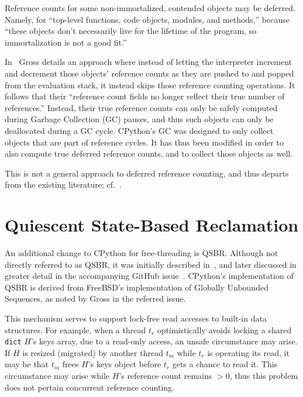 Reference counts for some non-immortalized, contended objects may be deferred.
Namely, for ``top-level functions, code objects, modules, and methods,'' because ``these objects don't necessarily live for the lifetime of the program, so immortalization is not a good fit.''

In~\cite[\S Deferred Reference Counting]{pep703} Gross details an approach where instead of letting the interpreter increment and decrement those objects' reference counts as they are pushed to and popped from the evaluation stack, it instead skips those reference counting operations.
It follows that their ``reference count fields no longer reflect their true number of references.''
Instead, their true reference counts can only be safely computed during Garbage Collection (GC) pauses, and thus such objects can only be deallocated during a GC cycle.
CPython's GC was designed to only collect objects that are part of reference cycles.
It has thus been modified in order to also compute true deferred reference counts, and to collect those objects as well.

This is not a general approach to deferred reference counting, and thus departs from the existing literature; cf.~\cite{deferred-refcounting}.


\section{Quiescent State-Based Reclamation}\label{sec:qsbr}

An additional change to CPython for free-threading is QSBR\@.
Although not directly referred to as QSBR, it was initially described in~\cite[\S Mimalloc Page Reuse]{pep703}, and later discussed in greater detail in the accompanying GitHub issue~\cite{qsbr}.
CPython's implementation of QSBR is derived from FreeBSD's implementation of Globally Unbounded Sequences, as noted by Gross in the referred issue.

This mechanism serves to support lock-free read accesses to built-in data structures.
For example, when a thread $t_r$ optimistically avoids locking a shared \texttt{dict} $H$'s keys array, due to a read-only access, an unsafe circumstance may arise.
If $H$ is resized (migrated) by another thread $t_m$ while $t_r$ is operating its read, it may be that $t_m$ frees $H$'s keys object before $t_r$ gets a chance to read it.
This circumstance may arise while $H$'s reference count remains $> 0$, thus this problem does not pertain concurrent reference counting.

